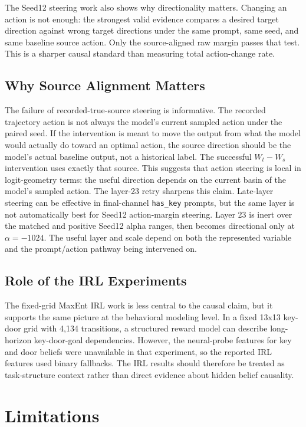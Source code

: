 \documentclass[11pt]{article}
\begin{document}
The Seed12 steering work also shows why directionality matters.
Changing an action is not enough: the strongest valid evidence compares a desired target direction against wrong target directions under the same prompt, same seed, and same baseline source action.
Only the source-aligned raw margin passes that test.
This is a sharper causal standard than measuring total action-change rate.

\subsection{Why Source Alignment Matters}

The failure of recorded-true-source steering is informative.
The recorded trajectory action is not always the model's current sampled action under the paired seed.
If the intervention is meant to move the output from what the model would actually do toward an optimal action, the source direction should be the model's actual baseline output, not a historical label.
The successful $W_t - W_s$ intervention uses exactly that source.
This suggests that action steering is local in logit-geometry terms: the useful direction depends on the current basin of the model's sampled action.
The layer-23 retry sharpens this claim.
Late-layer steering can be effective in final-channel \texttt{has\_key} prompts, but the same layer is not automatically best for Seed12 action-margin steering.
Layer 23 is inert over the matched and positive Seed12 alpha ranges, then becomes directional only at $\alpha=-1024$.
The useful layer and scale depend on both the represented variable and the prompt/action pathway being intervened on.

\subsection{Role of the IRL Experiments}

The fixed-grid MaxEnt IRL work is less central to the causal claim, but it supports the same picture at the behavioral modeling level.
In a fixed 13x13 key-door grid with 4,134 transitions, a structured reward model can describe long-horizon key-door-goal dependencies.
However, the neural-probe features for key and door beliefs were unavailable in that experiment, so the reported IRL features used binary fallbacks.
The IRL results should therefore be treated as task-structure context rather than direct evidence about hidden belief causality.

\section{Limitations}
\end{document}
